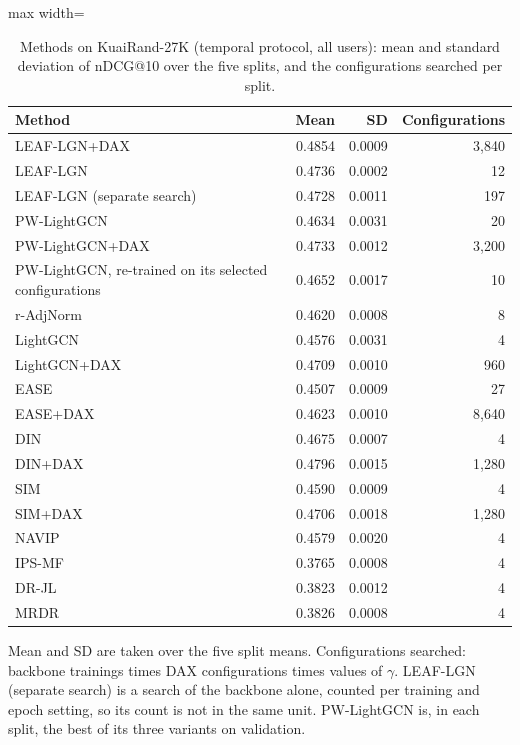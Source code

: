 \documentclass[preprint,12pt,authoryear]{elsarticle}
\begin{document}
\begin{table}[tbp]
\centering
\footnotesize
\caption{Methods on KuaiRand-27K (temporal protocol, all users): mean and standard deviation of nDCG@10 over the five splits, and the configurations searched per split.}
\label{tab:methods}
\begin{adjustbox}{max width=\linewidth}
\begin{tabular}{lrrr}
\toprule
Method & Mean & SD & Configurations \\
\midrule
LEAF-LGN+DAX & 0.4854 & 0.0009 & 3,840 \\
LEAF-LGN & 0.4736 & 0.0002 & 12 \\
LEAF-LGN (separate search) & 0.4728 & 0.0011 & 197 \\
PW-LightGCN & 0.4634 & 0.0031 & 20 \\
PW-LightGCN+DAX & 0.4733 & 0.0012 & 3,200 \\
PW-LightGCN, re-trained on its selected configurations & 0.4652 & 0.0017 & 10 \\
r-AdjNorm & 0.4620 & 0.0008 & 8 \\
LightGCN & 0.4576 & 0.0031 & 4 \\
LightGCN+DAX & 0.4709 & 0.0010 & 960 \\
EASE & 0.4507 & 0.0009 & 27 \\
EASE+DAX & 0.4623 & 0.0010 & 8,640 \\
DIN & 0.4675 & 0.0007 & 4 \\
DIN+DAX & 0.4796 & 0.0015 & 1,280 \\
SIM & 0.4590 & 0.0009 & 4 \\
SIM+DAX & 0.4706 & 0.0018 & 1,280 \\
NAVIP & 0.4579 & 0.0020 & 4 \\
IPS-MF & 0.3765 & 0.0008 & 4 \\
DR-JL & 0.3823 & 0.0012 & 4 \\
MRDR & 0.3826 & 0.0008 & 4 \\
\bottomrule
\end{tabular}
\end{adjustbox}
\par\smallskip
\begin{minipage}{\linewidth}\raggedright\footnotesize Mean and SD are taken over the five split means. Configurations searched: backbone trainings times DAX configurations times values of $\gamma$. LEAF-LGN (separate search) is a search of the backbone alone, counted per training and epoch setting, so its count is not in the same unit. PW-LightGCN is, in each split, the best of its three variants on validation. \end{minipage}
\end{table}
\end{document}
